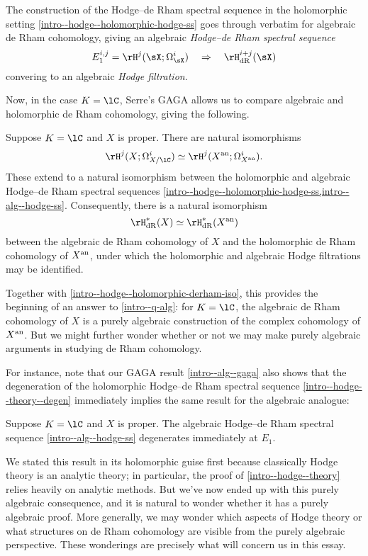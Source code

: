 \begin{nothing}
  \label{intro--alg--hodge-ss}
  The construction of the Hodge--de Rham spectral sequence in the holomorphic setting \cref{intro--hodge--holomorphic-hodge-ss} goes through verbatim for algebraic de Rham cohomology, giving an algebraic \emph{Hodge--de Rham spectral sequence}
  \[
    E^{i,j}_1 = \rH^j(\sX;\Omega^i_{\sX})
    \quad \Rightarrow \quad
    \rH^{i+j}_\dR(\sX)
  \]
  convering to an algebraic \emph{Hodge filtration}.
\end{nothing}

Now, in the case $K = \lC$, Serre's GAGA allows us to compare algebraic and holomorphic de Rham cohomology, giving the following.

\begin{theorem}
  \label{intro--alg--gaga}
  Suppose $K = \lC$ and $X$ is proper. There are natural isomorphisms
  \[
    \rH^j(X;\Omega_{X/\lC}^i) \iso \rH^j(X^\an;\Omega_{X^\an}^i).
  \]
  These extend to a natural isomorphism between the holomorphic and algebraic Hodge--de Rham spectral sequences \cref{intro--hodge--holomorphic-hodge-ss,intro--alg--hodge-ss}. Consequently, there is a natural isomorphism
  \[
    \rH_\dR^*(X) \iso \rH_\dR^*(X^\an)
  \]
  between the algebraic de Rham cohomology of $X$ and the holomorphic de Rham cohomology of $X^{\mathrm{an}}$, under which the holomorphic and algebraic Hodge filtrations may be identified.
\end{theorem}

Together with \cref{intro--hodge--holomorphic-derham-iso}, this provides the beginning of an answer to \cref{intro--q-alg}: for $K = \lC$, the algebraic de Rham cohomology of $X$ is a purely algebraic construction of the complex cohomology of $X^{\mathrm{an}}$. But we might further wonder whether or not we may make purely algebraic arguments in studying de Rham cohomology.

For instance, note that our GAGA result \cref{intro--alg--gaga} also shows that the degeneration of the holomorphic Hodge--de Rham spectral sequence \cref{intro--hodge--theory--degen} immediately implies the same result for the algebraic analogue:

\begin{corollary}
  \label{intro--alg--degen}
  Suppose $K = \lC$ and $X$ is proper. The algebraic Hodge--de Rham spectral sequence \cref{intro--alg--hodge-ss} degenerates immediately at $E_1$.
\end{corollary}

We stated this result in its holomorphic guise first because classically Hodge theory is an analytic theory; in particular, the proof of \cref{intro--hodge--theory} relies heavily on analytic methods. But we've now ended up with this purely algebraic consequence, and it is natural to wonder whether it has a purely algebraic proof. More generally, we may wonder which aspects of Hodge theory or what structures on de Rham cohomology are visible from the purely algebraic perspective. These wonderings are precisely what will concern us in this essay.

